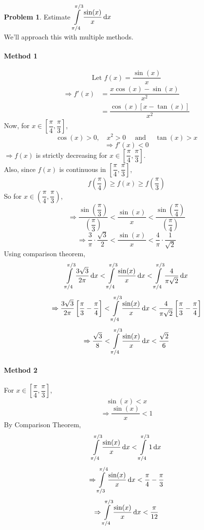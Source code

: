 \documentclass[14]{article}
\theoremstyle{definition}
\newtheorem{prob}{Problem}
\theoremstyle{case}
\begin{document}
\begin{prob}
Estimate $\displaystyle\int\limits_{\pi/4}^{\pi/3} \dfrac{\sin(x)}{x} \dif x$\\
We'll approach this with multiple methods.
\paragraph{Method 1}
\[\text{Let } f(x) = \dfrac{\sin(x)}{x}\]
\begin{align*}
\Rightarrow f'(x) &= \dfrac{x\cos(x) - \sin(x)}{x^2}\\
&= \dfrac{\cos(x) \left[ x - \tan(x) \right]}{x^2}
\end{align*}
Now, for $x \in \left[\dfrac{\pi}{4}, \dfrac{\pi}{3} \right]$,
\[\cos(x) > 0, \quad x^2 > 0 \quad \text{ and } \quad \tan(x) > x\]
\[\Rightarrow f'(x) < 0\]
$\Rightarrow f(x)$ is strictly decreasing for $x\in \left[\dfrac{\pi}{4}, \dfrac{\pi}{3} \right]$.\\
Also, since $f(x)$ is continuous in $\left[\dfrac{\pi}{4}, \dfrac{\pi}{3} \right]$,
\[f\left(\dfrac{\pi}{4}\right) \geq f(x) \geq f\left( \dfrac{\pi}{3} \right)\]
So for $x \in \left(\dfrac{\pi}{4}, \dfrac{\pi}{3} \right)$,
\[\Rightarrow \dfrac{\sin\left(\dfrac{\pi}{3}\right)}{\left(\dfrac{\pi}3\right)} < \dfrac{\sin(x)}{x} <\dfrac{\sin\left(\dfrac{\pi}{4}\right)}
{\left(\dfrac{\pi}4\right)} \]
\[\Rightarrow \dfrac3{\pi} \cdot \dfrac{\sqrt{3}}{2} < \dfrac{\sin(x)}{x} < \dfrac{4}{\pi} \cdot \dfrac{1}{\sqrt{2}}\]
Using comparison theorem,
\[\int\limits_{\pi/4}^{\pi/3} \dfrac{3 \sqrt3}{2\pi} \dif x < \int\limits_{\pi/4}^{\pi/3} \dfrac{\sin(x)}{x} \dif x < \int\limits_{\pi/4}^{\pi/3} \dfrac{4}{\pi \sqrt2} \dif x \]
\[\Rightarrow \dfrac{3\sqrt3}{2\pi} \left[ \dfrac{\pi}{3} - \dfrac{\pi}{4}\right] < \int\limits_{\pi/4}^{\pi/3} \dfrac{\sin(x)}{x} \dif x < \dfrac{4}{\pi \sqrt2} \left[ \dfrac{\pi}{3} - \dfrac{\pi}{4} \right] \]
\[\Rightarrow \dfrac{\sqrt3}{8} < \int\limits_{\pi/4}^{\pi/3} \dfrac{\sin(x)}{x} \dif x < \dfrac{\sqrt2}{6}\]
\pagebreak
\paragraph{Method 2}
For $x \in \left[\dfrac{\pi}{4}, \dfrac{\pi}{3} \right]$,
\[\sin(x) < x\]
\[\Rightarrow \dfrac{\sin(x)}{x} < 1\]
By Comparison Theorem,
\[\int\limits_{\pi/4}^{\pi/3} \dfrac{\sin(x)}{x} \dif x < \int\limits_{\pi/4}^{\pi/3} 1 \dif x\]
\[\Rightarrow \int\limits_{\pi/3}^{\pi/4} \dfrac{\sin(x)}{x} \dif x < \dfrac{\pi}4 - \dfrac{\pi}3\]
\[\Rightarrow \int\limits_{\pi/4}^{\pi/3} \dfrac{\sin(x)}{x} \dif x < \dfrac{\pi}{12}\]

\end{prob}
\end{document}
